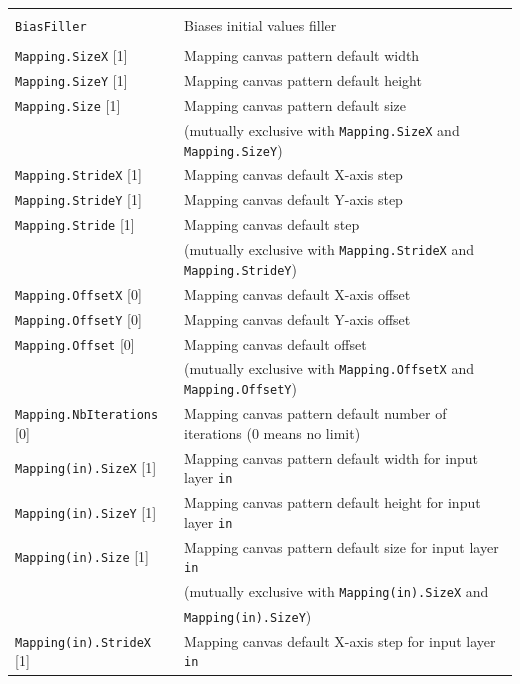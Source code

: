 \documentclass[a4paper,11pt,oneside]{article}
\begin{document}
\begin{center}
\begin{longtable}{| p{5cm} | p{10cm} | }
   & \\
  \lstinline!BiasFiller! & Biases initial values filler \\
   & \\
  \lstinline!Mapping.SizeX! [1] & Mapping canvas pattern default width \\
  \lstinline!Mapping.SizeY! [1] & Mapping canvas pattern default height \\
  \lstinline!Mapping.Size! [1] & Mapping canvas pattern default size \\
   & (mutually exclusive with \lstinline!Mapping.SizeX!
   and \lstinline!Mapping.SizeY!) \\
  \lstinline!Mapping.StrideX! [1] & Mapping canvas default X-axis step \\
  \lstinline!Mapping.StrideY! [1] & Mapping canvas default Y-axis step \\
  \lstinline!Mapping.Stride! [1] & Mapping canvas default step \\
   & (mutually exclusive with \lstinline!Mapping.StrideX!
   and \lstinline!Mapping.StrideY!) \\
  \lstinline!Mapping.OffsetX! [0] & Mapping canvas default X-axis offset \\
  \lstinline!Mapping.OffsetY! [0] & Mapping canvas default Y-axis offset \\
  \lstinline!Mapping.Offset! [0] & Mapping canvas default offset \\
   & (mutually exclusive with \lstinline!Mapping.OffsetX!
   and \lstinline!Mapping.OffsetY!) \\
  \lstinline!Mapping.NbIterations! [0] & Mapping canvas pattern default number
  of iterations (0 means no limit) \\
  \lstinline!Mapping(in).SizeX! [1] & Mapping canvas pattern default width
  for input layer \lstinline!in! \\
  \lstinline!Mapping(in).SizeY! [1] & Mapping canvas pattern default height
  for input layer \lstinline!in! \\
  \lstinline!Mapping(in).Size! [1] & Mapping canvas pattern default size
  for input layer \lstinline!in! \\
   & (mutually exclusive with \lstinline!Mapping(in).SizeX! and \\
   & \lstinline!Mapping(in).SizeY!) \\
  \lstinline!Mapping(in).StrideX! [1] & Mapping canvas default X-axis step
  for input layer \lstinline!in! \\

\end{longtable}
\end{center}
\end{document}

